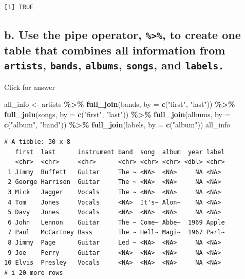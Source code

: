 \documentclass[
]{book}
\newenvironment{Shaded}{\begin{snugshade}}{\end{snugshade}}
\newcommand{\AttributeTok}[1]{\textcolor[rgb]{0.13,0.29,0.53}{#1}}
\newcommand{\FunctionTok}[1]{\textcolor[rgb]{0.13,0.29,0.53}{\textbf{#1}}}
\newcommand{\NormalTok}[1]{#1}
\newcommand{\OtherTok}[1]{\textcolor[rgb]{0.56,0.35,0.01}{#1}}
\newcommand{\SpecialCharTok}[1]{\textcolor[rgb]{0.81,0.36,0.00}{\textbf{#1}}}
\newcommand{\StringTok}[1]{\textcolor[rgb]{0.31,0.60,0.02}{#1}}
\begin{document}
\begin{verbatim}
[1] TRUE
\end{verbatim}

\hypertarget{b.-use-the-pipe-operator-to-create-one-table-that-combines-all-information-from-artists-bands-albums-songs-and-labels.}{%
\subsection{\texorpdfstring{b. Use the pipe operator, \texttt{\%\textgreater{}\%}, to create one table that combines all information from \texttt{artists}, \texttt{bands}, \texttt{albums}, \texttt{songs}, and \texttt{labels.}}{b. Use the pipe operator, \%\textgreater\%, to create one table that combines all information from artists, bands, albums, songs, and labels.}}\label{b.-use-the-pipe-operator-to-create-one-table-that-combines-all-information-from-artists-bands-albums-songs-and-labels.}}

Click for answer

\begin{Shaded}
\begin{Highlighting}[]
\NormalTok{all\_info }\OtherTok{\textless{}{-}}\NormalTok{ artists }\SpecialCharTok{\%\textgreater{}\%} 
  \FunctionTok{full\_join}\NormalTok{(bands, }\AttributeTok{by =} \FunctionTok{c}\NormalTok{(}\StringTok{"first"}\NormalTok{, }\StringTok{"last"}\NormalTok{)) }\SpecialCharTok{\%\textgreater{}\%} 
  \FunctionTok{full\_join}\NormalTok{(songs, }\AttributeTok{by =} \FunctionTok{c}\NormalTok{(}\StringTok{"first"}\NormalTok{, }\StringTok{"last"}\NormalTok{)) }\SpecialCharTok{\%\textgreater{}\%} 
  \FunctionTok{full\_join}\NormalTok{(albums, }\AttributeTok{by =} \FunctionTok{c}\NormalTok{(}\StringTok{"album"}\NormalTok{, }\StringTok{"band"}\NormalTok{)) }\SpecialCharTok{\%\textgreater{}\%}
  \FunctionTok{full\_join}\NormalTok{(labels, }\AttributeTok{by =} \FunctionTok{c}\NormalTok{(}\StringTok{"album"}\NormalTok{))}
\NormalTok{all\_info}
\end{Highlighting}
\end{Shaded}

\begin{verbatim}
# A tibble: 30 x 8
   first  last      instrument band  song  album  year label
   <chr>  <chr>     <chr>      <chr> <chr> <chr> <dbl> <chr>
 1 Jimmy  Buffett   Guitar     The ~ <NA>  <NA>     NA <NA> 
 2 George Harrison  Guitar     The ~ <NA>  <NA>     NA <NA> 
 3 Mick   Jagger    Vocals     The ~ <NA>  <NA>     NA <NA> 
 4 Tom    Jones     Vocals     <NA>  It's~ Alon~    NA <NA> 
 5 Davy   Jones     Vocals     <NA>  <NA>  <NA>     NA <NA> 
 6 John   Lennon    Guitar     The ~ Come~ Abbe~  1969 Apple
 7 Paul   McCartney Bass       The ~ Hell~ Magi~  1967 Parl~
 8 Jimmy  Page      Guitar     Led ~ <NA>  <NA>     NA <NA> 
 9 Joe    Perry     Guitar     <NA>  <NA>  <NA>     NA <NA> 
10 Elvis  Presley   Vocals     <NA>  <NA>  <NA>     NA <NA> 
# i 20 more rows
\end{verbatim}
\end{document}
